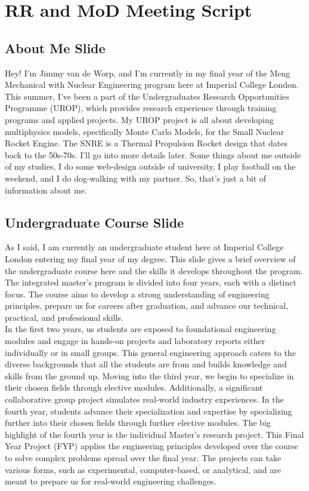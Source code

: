 \documentclass[8pt,a5paper]{article}
\begin{document}

\small

\section*{RR and MoD Meeting Script}

\subsection*{About Me Slide}

Hey! I'm Jimmy van de Worp, and I'm currently in my final year of the Meng Mechanical with Nuclear Engineering program here at Imperial College London. This summer, I've been a part of the Undergraduates Research Opportunities Programme (UROP), which provides research experience through training programs and applied projects. My UROP project is all about developing multiphysics models, specifically Monte Carlo Models, for the Small Nuclear Rocket Engine. The SNRE is a Thermal Propulsion Rocket design that dates back to the 50s-70s. I'll go into more details later. Some things about me outside of my studies, I do some web-design outside of university, I play football on the weekend, and I do dog-walking with my partner. So, that's just a bit of information about me.

\subsection*{Undergraduate Course Slide}

As I said, I am currently an undergraduate student here at Imperial College London entering my final year of my degree. This slide gives a brief overview of the undergraduate course here and the skills it develops throughout the program. The integrated master's program is divided into four years, each with a distinct focus. The course aims to develop a strong understanding of engineering principles, prepare us for careers after graduation, and advance our technical, practical, and professional skills. \\

In the first two years, us students are exposed to foundational engineering modules and engage in hands-on projects and laboratory reports either individually or in small groups. This general engineering approach caters to the diverse backgrounds that all the students are from and builds knowledge and skills from the ground up. Moving into the third year, we begin to specialize in their chosen fields through elective modules. Additionally, a significant collaborative group project simulates real-world industry experiences. In the fourth year, students advance their specialization and expertise by specializing further into their chosen fields through further elective modules. The big highlight of the fourth year is the individual Master's research project. This Final Year Project (FYP) applies the engineering principles developed over the course to solve complex problems spread over the final year. The projects can take various forms, such as experimental, computer-based, or analytical, and are meant to prepare us for real-world engineering challenges. \\
\end{document}
